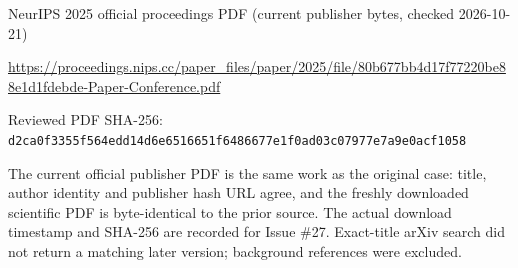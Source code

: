 \documentclass[11pt]{article}
\begin{document}
NeurIPS 2025 official proceedings PDF (current publisher bytes, checked 2026-10-21)

\url{https://proceedings.nips.cc/paper_files/paper/2025/file/80b677bb4d17f77220be88e1d1fdebde-Paper-Conference.pdf}

Reviewed PDF SHA-256: \nolinkurl{d2ca0f3355f564edd14d6e6516651f6486677e1f0ad03c07977e7a9e0acf1058}

The current official publisher PDF is the same work as the original case: title, author identity and publisher hash URL agree, and the freshly downloaded scientific PDF is byte-identical to the prior source. The actual download timestamp and SHA-256 are recorded for Issue \#27. Exact-title arXiv search did not return a matching later version; background references were excluded.
\end{document}

